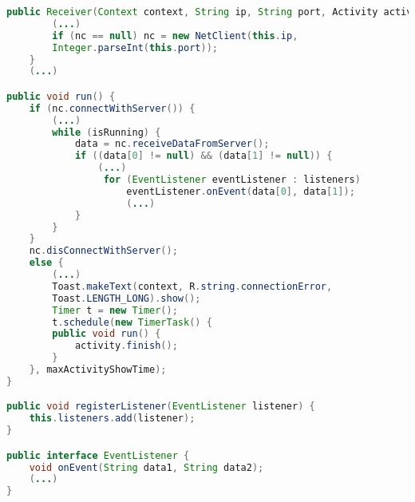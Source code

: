 \label{appCode:klasseReceiver}
\begin{lstlisting}[language=java, caption=Klasse Receiver]
    public Receiver(Context context, String ip, String port, Activity activity){
        (...)
        if (nc == null) nc = new NetClient(this.ip, 
        Integer.parseInt(this.port));
    }
	(...)

public void run() {
	if (nc.connectWithServer()) {
	    (...)
        while (isRunning) {
	        data = nc.receiveDataFromServer();
			if ((data[0] != null) && (data[1] != null)) {
	            (...)
                 for (EventListener eventListener : listeners)
	                 eventListener.onEvent(data[0], data[1]);
                     (...)
            }
        }
    }
	nc.disConnectWithServer();
    else {
		(...)
        Toast.makeText(context, R.string.connectionError, 
        Toast.LENGTH_LONG).show();
        Timer t = new Timer();
        t.schedule(new TimerTask() {
        public void run() {
		    activity.finish();
		}
	}, maxActivityShowTime);
}

public void registerListener(EventListener listener) {
	this.listeners.add(listener);
}

public interface EventListener {
    void onEvent(String data1, String data2);
	(...)
}
\end{lstlisting}

